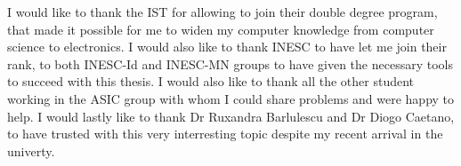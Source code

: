 
\begin{acknowledgments}

  I would like to thank the \ac{IST} for allowing to join their double degree program, that made it possible for me to widen my computer knowledge from computer science to electronics.
  I would also like to thank \ac{INESC} to have let me join their rank, to both \ac{INESC}-Id and \ac{INESC}-MN groups to have given the necessary tools to succeed with this thesis.
  I would also like to thank all the other student working in the \ac{ASIC} group with whom I could share problems and were happy to help.
  I would lastly like to thank Dr Ruxandra Barlulescu and Dr Diogo Caetano, to have trusted with this very interresting topic despite my recent arrival in the univerty.

\end{acknowledgments}
\clearpage
\thispagestyle{empty}
\cleardoublepage

